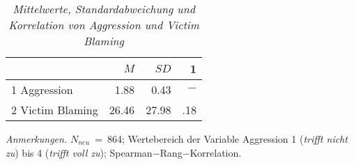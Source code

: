 \begin{table}[htb]
    \caption[Mittelwerte, Standardabweichung und Korrelation von Aggression und Victim Blaming]{\textit {Mittelwerte, Standardabweichung und Korrelation von Aggression und Victim Blaming}} 
    \label{H1_Spearman}
    \centering
    \begin{adjustbox}{width=6.5cm} %
    \small
    \begin{tabular}{lrrr}
      \hline
        & $M$   & $SD$ & 1 \\
      \hline
    1 Aggression      & 1.88  & 0.43   & $-$      \\
    2 Victim Blaming  & 26.46 & 27.98  & .18      \\
       \hline
    \end{tabular}
    \end{adjustbox}
    
    \begin{tablenotes}
        \item \textit{Anmerkungen.} \( N_{neu} \)~=~864; Wertebereich der Variable Aggression 1 (\textit{trifft nicht zu}) bis 4 (\textit{trifft voll zu}); Spearman$-$Rang$-$Korrelation.
      \end{tablenotes}
    \end{table}

